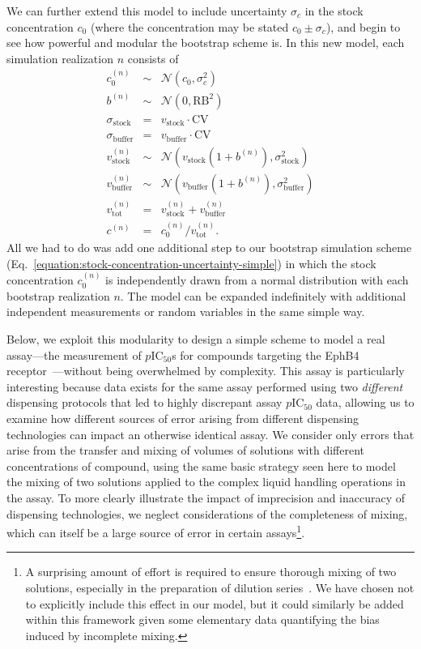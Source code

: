 \documentclass[aps,pre,twocolumn,nofootinbib,superscriptaddress,linenumbers]{revtex4-1}
\begin{document}
We can further extend this model to include uncertainty $\sigma_c$ in the stock concentration $c_0$ (where the concentration may be stated $c_0 \pm \sigma_c$), and begin to see how powerful and modular the bootstrap scheme is.
In this new model, each simulation realization $n$ consists of
\begin{eqnarray}
c_0^{(n)} &\sim& \mathcal{N}(c_0, \sigma_c^2) \nonumber \label{equation:stock-concentration-uncertainty-simple} \\
b^{(n)} &\sim& \mathcal{N}(0, \mathrm{RB}^2) \nonumber \\
\sigma_\mathrm{stock} &=& v_\mathrm{stock} \cdot \mathrm{CV} \nonumber \\
\sigma_\mathrm{buffer} &=& v_\mathrm{buffer} \cdot \mathrm{CV} \nonumber \\
v_\mathrm{stock}^{(n)} &\sim& \mathcal{N}(v_\mathrm{stock} (1 + b^{(n)}) , \sigma_\mathrm{stock}^2) \nonumber \\
v_\mathrm{buffer}^{(n)} &\sim& \mathcal{N}(v_\mathrm{buffer} (1 + b^{(n)}), \sigma_\mathrm{buffer}^2) \nonumber \\
v_\mathrm{tot}^{(n)} &=& v_\mathrm{stock}^{(n)} + v_\mathrm{buffer}^{(n)} \nonumber \\
c^{(n)} &=& c_0^{(n)} / v_\mathrm{tot}^{(n)} .
\end{eqnarray}
All we had to do was add one additional step to our bootstrap simulation scheme (Eq.~\ref{equation:stock-concentration-uncertainty-simple}) in which the stock concentration $c_0^{(n)}$ is independently drawn from a normal distribution with each bootstrap realization $n$.
The model can be expanded indefinitely with additional independent measurements or random variables in the same simple way.

Below, we exploit this modularity to design a simple scheme to model a real assay---the measurement of $p$IC$_{50}$s for compounds targeting the EphB4 receptor~\cite{ekins_dispensing_2013,barlaam_novel_2009,barlaam_pyrimidine_2010}---without being overwhelmed by complexity.
This assay is particularly interesting because data exists for the same assay performed using two \emph{different} dispensing protocols that led to highly discrepant assay $p$IC$_{50}$ data, allowing us to examine how different sources of error arising from different dispensing technologies can impact an otherwise identical assay.
We consider only errors that arise from the transfer and mixing of volumes of solutions with different concentrations of compound, using the same basic strategy seen here to model the mixing of two solutions applied to the complex liquid handling operations in the assay.
To more clearly illustrate the impact of imprecision and inaccuracy of dispensing technologies, we neglect considerations of the completeness of mixing, which can itself be a large source of error in certain assays\footnote{A surprising amount of effort is required to ensure thorough mixing of two solutions, especially in the preparation of dilution series~\cite{walling_mixing_2007,weiss_modeling_2002,mitre_turbo-mixing_2007}. We have chosen not to explicitly include this effect in our model, but it could similarly be added within this framework given some elementary data quantifying the bias induced by incomplete mixing.}.
\end{document}
